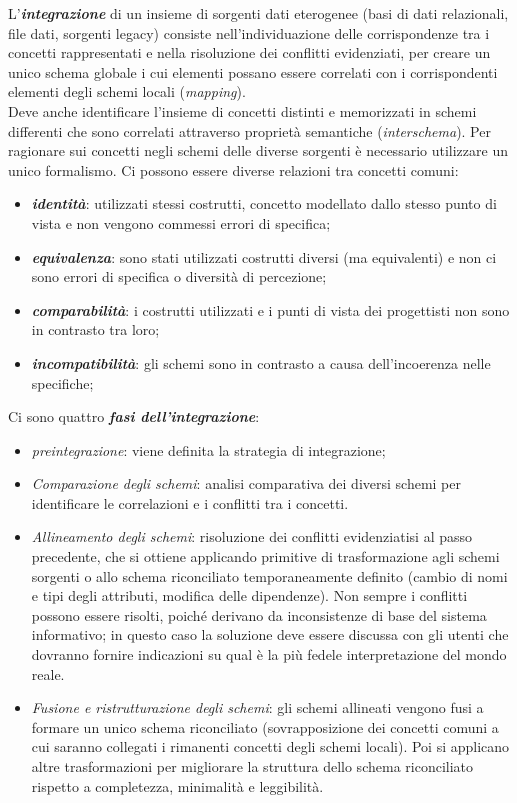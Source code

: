 \documentclass[a4paper, notitlepage, 9pt]{extreport}
\begin{document}
\noindent
L’\textit{\textbf{integrazione}} di un insieme di sorgenti dati eterogenee (basi di dati relazionali, file dati, sorgenti legacy) consiste nell’individuazione delle corrispondenze tra i concetti rappresentati e nella risoluzione dei conflitti evidenziati, per creare un unico schema globale i cui elementi possano essere correlati con i corrispondenti elementi degli schemi locali (\textit{mapping}).\\
Deve anche identificare l’insieme di concetti distinti e memorizzati in schemi differenti che sono correlati attraverso proprietà semantiche (\textit{interschema}). Per ragionare sui concetti negli schemi delle diverse sorgenti è necessario utilizzare un unico formalismo.
Ci possono essere diverse relazioni tra concetti comuni:
\begin{itemize}
	\item \textit{\textbf{identità}}: utilizzati stessi costrutti, concetto modellato dallo stesso punto di vista e non vengono commessi errori di specifica;
	\item \textit{\textbf{equivalenza}}: sono stati utilizzati costrutti diversi (ma equivalenti) e non ci sono errori di specifica o diversità di percezione;
	\item \textit{\textbf{comparabilità}}: i costrutti utilizzati e i punti di vista dei progettisti non sono in contrasto tra loro;
	\item \textit{\textbf{incompatibilità}}: gli schemi sono in contrasto a causa dell’incoerenza nelle specifiche;
\end{itemize}
Ci sono quattro \textit{\textbf{fasi dell'integrazione}}:
\begin{itemize}
	\item \textit{preintegrazione}: viene definita la strategia di integrazione;
	\item \textit{Comparazione degli schemi}: analisi comparativa dei diversi schemi per identificare le correlazioni e i conflitti tra i concetti.
	\item \textit{Allineamento degli schemi}: risoluzione dei conflitti evidenziatisi al passo precedente, che si ottiene applicando primitive di trasformazione agli schemi sorgenti o allo schema riconciliato temporaneamente definito (cambio di nomi e tipi degli attributi, modifica delle dipendenze). Non sempre i conflitti possono essere risolti, poiché derivano da inconsistenze di base del sistema informativo; in questo caso la soluzione deve essere discussa con gli utenti che dovranno fornire indicazioni su qual è la più fedele interpretazione del mondo reale.
	\item \textit{Fusione e ristrutturazione degli schemi}: gli schemi allineati vengono fusi a formare un unico schema riconciliato (sovrapposizione dei concetti comuni a cui saranno collegati i rimanenti concetti degli schemi locali). Poi si applicano altre trasformazioni per migliorare la struttura dello schema riconciliato rispetto a completezza, minimalità e leggibilità.
\end{itemize}
\end{document}
